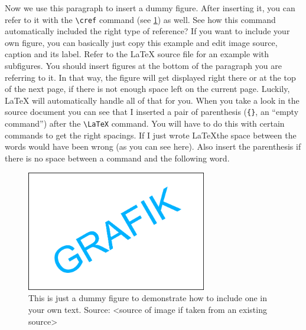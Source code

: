 Now we use this paragraph to insert a dummy figure.
After inserting it, you can refer to it with the \texttt{\textbackslash{}cref} command (see \cref{fig:dummy}) as well.
See how this command automatically included the right type of reference?
If you want to include your own figure, you can basically just copy this example and edit image source, caption and its label.
Refer to the \LaTeX{} source file for an example with subfigures.
You should insert figures at the bottom of the paragraph you are referring to it.
In that way, the figure will get displayed right there or at the top of the next page, if there is not enough space left on the current page.
Luckily, \LaTeX{} will automatically handle all of that for you.
When you take a look in the source document you can see that I inserted a pair of parenthesis (\texttt{\{\}}, an ``empty command'') after the \texttt{\textbackslash{}LaTeX} command.
You will have to do this with certain commands to get the right spacings.
If I just wrote \LaTeX the space between the words would have been wrong (as you can see here).
Also insert the parenthesis if there is no space between a command and the following word.
\begin{figure}[th]
	\centering
	\includegraphics[width=0.7\textwidth]{src/images/dummy}
	\caption[Dummy figure]{This is just a dummy figure to demonstrate how to include one in your own text.  Source: <source of image if taken from an existing source>}
	\label{fig:dummy}
\end{figure}


